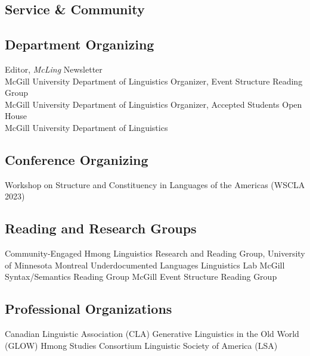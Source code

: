 \documentclass[11pt,oneside,letterpaper]{johnstoncv}
\begin{document}
\begin{entries}
\section{Service \& Community}

\subsection{Department Organizing}
\Item[2019--2021] Editor, \textit{McLing} Newsletter\\McGill University Department of Linguistics 
\Item[2021] Organizer, Event Structure Reading Group\\McGill University Department of Linguistics
\Item[2020, 2021] Organizer, Accepted Students Open House\\McGill University Department of Linguistics

\subsection{Conference Organizing}
\Item[2023] Workshop on Structure and Constituency in Languages of the Americas (WSCLA 2023)

\subsection{Reading and Research Groups}
\Item[2022--Present] Community-Engaged Hmong Linguistics Research and Reading Group, University of Minnesota
\Item[2020--Present] Montreal Underdocumented Languages Linguistics Lab
\Item[2018--Present] McGill Syntax/Semantics Reading Group
\Item[2021] McGill Event Structure Reading Group

\subsection{Professional Organizations}
\Item[2024--Present] Canadian Linguistic Association (CLA)
\Item[2024--Present] Generative Linguistics in the Old World (GLOW)
\Item[2023--Present] Hmong Studies Consortium
\Item[2021--Present] Linguistic Society of America (LSA)



\end{entries}
\end{document}
